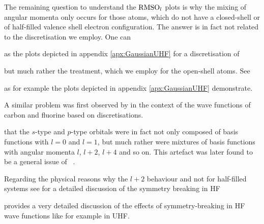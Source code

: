 
The remaining question to understand the $\text{RMSO}_l$ plots
is why the mixing of angular momenta
only occurs for those atoms,
which do not have a closed-shell or of half-filled valence shell electron configuration.
The answer is in fact not related to the \CS discretisation we employ.
One can 


as the plots depicted in appendix \vref{apx:GaussianUHF}
for a \cGTO discretisation of 




but much rather the \UHF treatment,
which we employ for the open-shell atoms.
See 


as for example the plots depicted in appendix \vref{apx:GaussianUHF}
demonstrate.


A similar problem was first observed by \citet{Cook1981}
in the context of the \UHF wave functions of carbon and fluorine
based on \cGTO discretisations.


that the $s$-type and $p$-type \SCF orbitals
were in fact not only composed of \cGTO basis functions with $l=0$ and $l=1$,
but much rather were mixtures of basis functions with
angular momenta $l$, $l+2$, $l+4$ and so on.
This artefact was later found to be a general issue of \UHF~\cite{Cook1984,McWeeny1985}.

Regarding the physical reasons why 
the $l+2$ behaviour and not for half-filled systems
see \cite{Fukutome1981}
for a detailed discussion of the symmetry breaking in HF

\citet{Fukutome1981} provides a very detailed discussion of the
effects of symmetry-breaking in HF wave functions like for example in UHF.
\label{sec:IssuesUHF}





